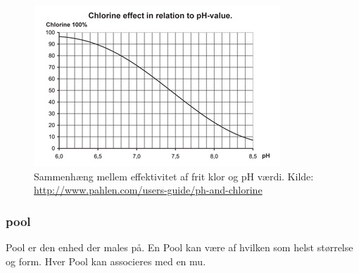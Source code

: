 \begin{figure}
	\centering
	\includegraphics[width=0.7\linewidth]{figs/chlorinePh.png}
	\caption{Sammenhæng mellem effektivitet af frit klor og pH værdi. Kilde: \url{http://www.pahlen.com/users-guide/ph-and-chlorine}}
	\label{fig:chlorinePh}
\end{figure}


\subsubsection{\gls{pool}}
Pool er den enhed der males på. En Pool kan være af hvilken som helst størrelse og form. Hver Pool kan associeres med en \gls{mu}.